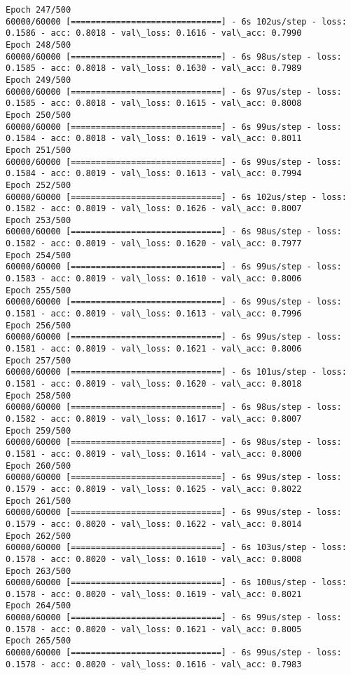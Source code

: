 \documentclass[11pt]{article}
\begin{document}
\begin{Verbatim}[commandchars=\\\{\}]
Epoch 247/500
60000/60000 [==============================] - 6s 102us/step - loss: 0.1586 - acc: 0.8018 - val\_loss: 0.1616 - val\_acc: 0.7990
Epoch 248/500
60000/60000 [==============================] - 6s 98us/step - loss: 0.1585 - acc: 0.8018 - val\_loss: 0.1630 - val\_acc: 0.7989
Epoch 249/500
60000/60000 [==============================] - 6s 97us/step - loss: 0.1585 - acc: 0.8018 - val\_loss: 0.1615 - val\_acc: 0.8008
Epoch 250/500
60000/60000 [==============================] - 6s 99us/step - loss: 0.1584 - acc: 0.8018 - val\_loss: 0.1619 - val\_acc: 0.8011
Epoch 251/500
60000/60000 [==============================] - 6s 99us/step - loss: 0.1584 - acc: 0.8019 - val\_loss: 0.1613 - val\_acc: 0.7994
Epoch 252/500
60000/60000 [==============================] - 6s 102us/step - loss: 0.1582 - acc: 0.8019 - val\_loss: 0.1626 - val\_acc: 0.8007
Epoch 253/500
60000/60000 [==============================] - 6s 98us/step - loss: 0.1582 - acc: 0.8019 - val\_loss: 0.1620 - val\_acc: 0.7977
Epoch 254/500
60000/60000 [==============================] - 6s 99us/step - loss: 0.1583 - acc: 0.8019 - val\_loss: 0.1610 - val\_acc: 0.8006
Epoch 255/500
60000/60000 [==============================] - 6s 99us/step - loss: 0.1581 - acc: 0.8019 - val\_loss: 0.1613 - val\_acc: 0.7996
Epoch 256/500
60000/60000 [==============================] - 6s 99us/step - loss: 0.1581 - acc: 0.8019 - val\_loss: 0.1621 - val\_acc: 0.8006
Epoch 257/500
60000/60000 [==============================] - 6s 101us/step - loss: 0.1581 - acc: 0.8019 - val\_loss: 0.1620 - val\_acc: 0.8018
Epoch 258/500
60000/60000 [==============================] - 6s 98us/step - loss: 0.1582 - acc: 0.8019 - val\_loss: 0.1617 - val\_acc: 0.8007
Epoch 259/500
60000/60000 [==============================] - 6s 98us/step - loss: 0.1581 - acc: 0.8019 - val\_loss: 0.1614 - val\_acc: 0.8000
Epoch 260/500
60000/60000 [==============================] - 6s 99us/step - loss: 0.1579 - acc: 0.8019 - val\_loss: 0.1625 - val\_acc: 0.8022
Epoch 261/500
60000/60000 [==============================] - 6s 99us/step - loss: 0.1579 - acc: 0.8020 - val\_loss: 0.1622 - val\_acc: 0.8014
Epoch 262/500
60000/60000 [==============================] - 6s 103us/step - loss: 0.1578 - acc: 0.8020 - val\_loss: 0.1610 - val\_acc: 0.8008
Epoch 263/500
60000/60000 [==============================] - 6s 100us/step - loss: 0.1578 - acc: 0.8020 - val\_loss: 0.1619 - val\_acc: 0.8021
Epoch 264/500
60000/60000 [==============================] - 6s 99us/step - loss: 0.1578 - acc: 0.8020 - val\_loss: 0.1621 - val\_acc: 0.8005
Epoch 265/500
60000/60000 [==============================] - 6s 99us/step - loss: 0.1578 - acc: 0.8020 - val\_loss: 0.1616 - val\_acc: 0.7983

\end{Verbatim}
\end{document}
